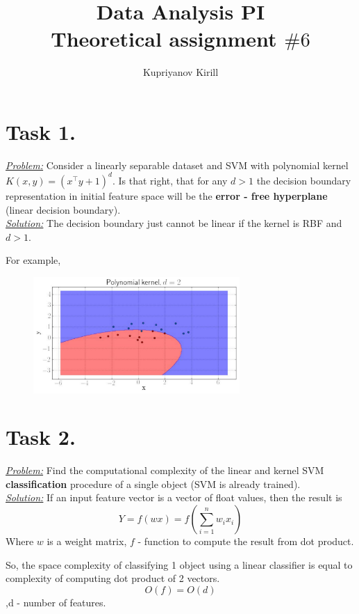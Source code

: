 \documentclass[a4paper,12pt]{article}
\author{Kupriyanov Kirill}
\title{Data Analysis PI\\Theoretical assignment $\#6$}
\date{}
\begin{document}
\maketitle
\thispagestyle{empty}
\newpage
\section*{Task 1.}
\underline{\textit{Problem:}} Consider a linearly separable dataset and SVM
with polynomial kernel \(K(x, y) = (x^\top y + 1)^d\). Is that right, that for
any \(d > 1\) the decision boundary representation in initial feature space
will be the \textbf{error - free hyperplane} (linear decision boundary).\\
\newline
\underline{\textit{Solution:}} The decision boundary just cannot be linear if the
kernel is RBF and \(d > 1\).

For example,

\begin{figure}[h]
    \centering
\includegraphics[width=0.7\textwidth]{example1}
\end{figure}

\newpage
\section*{Task 2.}
\underline{\textit{Problem:}} Find the computational complexity of the linear and kernel SVM \textbf{classification} procedure of a single
object (SVM is already trained).\\
\newline
\underline{\textit{Solution:}} If an input feature vector is a vector of float values, then the result is
\[
    Y = f(wx) = f\left(\sum\limits_{i=1}^{n}w_ix_i\right)
\]
Where \(w\) is a weight matrix, \(f\) - function to compute the result from dot
product.

So, the space complexity of classifying 1 object using a linear classifier
is equal to complexity of computing dot product of 2 vectors.
\[
    O(f) = O(d)
\]
,d - number of features.
\end{document}
